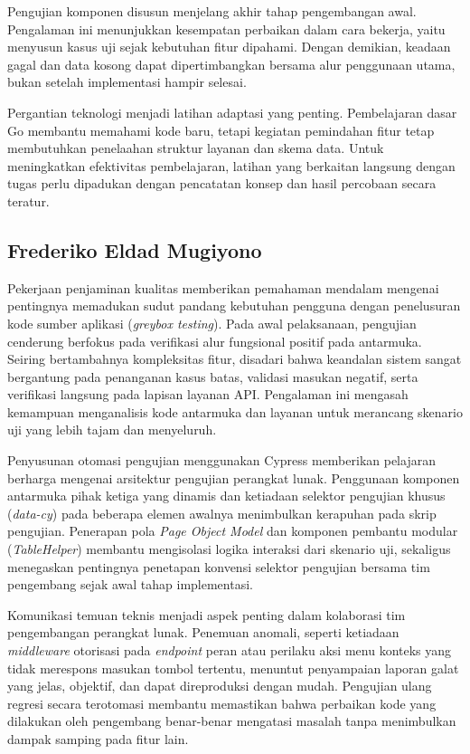 Pengujian komponen disusun menjelang akhir tahap pengembangan awal. Pengalaman ini menunjukkan kesempatan perbaikan dalam cara bekerja, yaitu menyusun kasus uji sejak kebutuhan fitur dipahami. Dengan demikian, keadaan gagal dan data kosong dapat dipertimbangkan bersama alur penggunaan utama, bukan setelah implementasi hampir selesai.

Pergantian teknologi menjadi latihan adaptasi yang penting. Pembelajaran dasar Go membantu memahami kode baru, tetapi kegiatan pemindahan fitur tetap membutuhkan penelaahan struktur layanan dan skema data. Untuk meningkatkan efektivitas pembelajaran, latihan yang berkaitan langsung dengan tugas perlu dipadukan dengan pencatatan konsep dan hasil percobaan secara teratur.

\subsection{Frederiko Eldad Mugiyono}
Pekerjaan penjaminan kualitas memberikan pemahaman mendalam mengenai pentingnya memadukan sudut pandang kebutuhan pengguna dengan penelusuran kode sumber aplikasi (\textit{greybox testing}). Pada awal pelaksanaan, pengujian cenderung berfokus pada verifikasi alur fungsional positif pada antarmuka. Seiring bertambahnya kompleksitas fitur, disadari bahwa keandalan sistem sangat bergantung pada penanganan kasus batas, validasi masukan negatif, serta verifikasi langsung pada lapisan layanan API. Pengalaman ini mengasah kemampuan menganalisis kode antarmuka dan layanan untuk merancang skenario uji yang lebih tajam dan menyeluruh.

Penyusunan otomasi pengujian menggunakan Cypress memberikan pelajaran berharga mengenai arsitektur pengujian perangkat lunak. Penggunaan komponen antarmuka pihak ketiga yang dinamis dan ketiadaan selektor pengujian khusus (\textit{data-cy}) pada beberapa elemen awalnya menimbulkan kerapuhan pada skrip pengujian. Penerapan pola \textit{Page Object Model} dan komponen pembantu modular (\textit{TableHelper}) membantu mengisolasi logika interaksi dari skenario uji, sekaligus menegaskan pentingnya penetapan konvensi selektor pengujian bersama tim pengembang sejak awal tahap implementasi.

Komunikasi temuan teknis menjadi aspek penting dalam kolaborasi tim pengembangan perangkat lunak. Penemuan anomali, seperti ketiadaan \textit{middleware} otorisasi pada \textit{endpoint} peran atau perilaku aksi menu konteks yang tidak merespons masukan tombol tertentu, menuntut penyampaian laporan galat yang jelas, objektif, dan dapat direproduksi dengan mudah. Pengujian ulang regresi secara terotomasi membantu memastikan bahwa perbaikan kode yang dilakukan oleh pengembang benar-benar mengatasi masalah tanpa menimbulkan dampak samping pada fitur lain.

